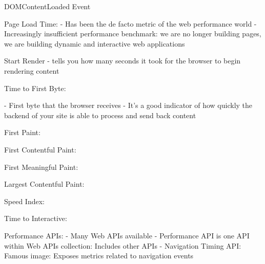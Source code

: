 DOMContentLoaded Event %




Page Load Time: %
- Has been the de facto metric of the web performance world
- Increasingly insufficient performance benchmark: we are no longer building pages, we are building dynamic and interactive web applications




Start Render %
- tells you how many seconds it took for the browser to begin rendering content


Time to First Byte: %

- First byte that the browser receives
- It’s a good indicator of how quickly the backend of your site is able to process and send back content








First Paint: %


First Contentful Paint: %


First Meaningful Paint: %


Largest Contentful Paint: %


Speed Index: %


Time to Interactive: %













Performance APIs:
- Many Web APIs available %
- Performance API is one API within Web APIs collection: Includes other APIs
- Navigation Timing API: Famous image: Exposes metrics related to navigation events

